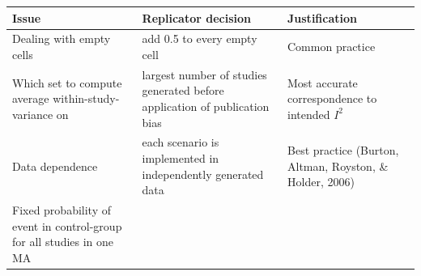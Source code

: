 \documentclass[
  english,
  doc,floatsintext,draftall]{apa6}
\begin{document}
\begin{longtable}[]{@{}lll@{}}
\toprule
\begin{minipage}[b]{0.33\columnwidth}\raggedright
Issue\strut
\end{minipage} & \begin{minipage}[b]{0.33\columnwidth}\raggedright
Replicator decision\strut
\end{minipage} & \begin{minipage}[b]{0.25\columnwidth}\raggedright
Justification\strut
\end{minipage}\tabularnewline
\midrule
\endhead
\begin{minipage}[t]{0.33\columnwidth}\raggedright
Dealing with empty cells\strut
\end{minipage} & \begin{minipage}[t]{0.33\columnwidth}\raggedright
add 0.5 to every empty cell\strut
\end{minipage} & \begin{minipage}[t]{0.25\columnwidth}\raggedright
Common practice\strut
\end{minipage}\tabularnewline
\begin{minipage}[t]{0.33\columnwidth}\raggedright
Which set to compute average within-study-variance on\strut
\end{minipage} & \begin{minipage}[t]{0.33\columnwidth}\raggedright
largest number of studies generated before application of publication bias\strut
\end{minipage} & \begin{minipage}[t]{0.25\columnwidth}\raggedright
Most accurate correspondence to intended \(I^2\)\strut
\end{minipage}\tabularnewline
\begin{minipage}[t]{0.33\columnwidth}\raggedright
Data dependence\strut
\end{minipage} & \begin{minipage}[t]{0.33\columnwidth}\raggedright
each scenario is implemented in independently generated data\strut
\end{minipage} & \begin{minipage}[t]{0.25\columnwidth}\raggedright
Best practice (Burton, Altman, Royston, \& Holder, 2006)\strut
\end{minipage}\tabularnewline
\begin{minipage}[t]{0.33\columnwidth}\raggedright
Fixed probability of event in control-group for all studies in one MA\strut
\end{minipage} & \begin{minipage}[t]{0.33\columnwidth}\raggedright

\end{minipage}
\end{longtable}
\end{document}
